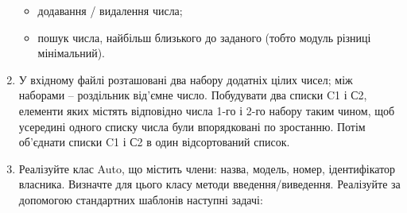 \documentclass[]{article}
\begin{document}
\begin{enumerate}
  \begin{itemize}
  \item
    додавання / видалення числа;
  \item
    пошук числа, найбільш близького до заданого (тобто модуль різниці
    мінімальний).
  \end{itemize}
\item
  У вхідному файлі розташовані два набору додатніх цілих чисел; між
  наборами -- роздільник від'ємне число. Побудувати два списки C1 і С2,
  елементи яких містять відповідно числа 1-го і 2-го набору таким чином,
  щоб усередині одного списку числа були впорядковані по зростанню.
  Потім об'єднати списки C1 і С2 в один відсортований список.
\item
  Реалізуйте клас Auto, що містить члени: назва, модель, номер,
  ідентифікатор власника. Визначте для цього класу методи
  введення/виведення. Реалізуйте за допомогою стандартних шаблонів
  наступні задачі:


\end{enumerate}
\end{document}

